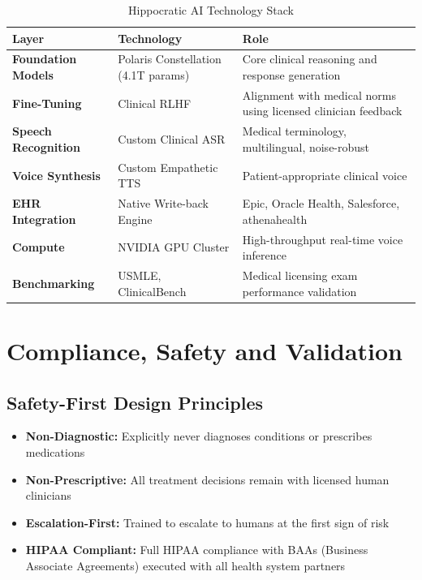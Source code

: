 \documentclass[12pt,a4paper]{article}
\begin{document}
\begin{table}[H]
\centering
\renewcommand{\arraystretch}{1.4}
\begin{tabularx}{\textwidth}{llX}
\toprule
\textbf{Layer} & \textbf{Technology} & \textbf{Role} \\
\midrule
\textbf{Foundation Models} & Polaris Constellation (4.1T params) & Core clinical reasoning and response generation \\
\textbf{Fine-Tuning} & Clinical RLHF & Alignment with medical norms using licensed clinician feedback \\
\textbf{Speech Recognition} & Custom Clinical ASR & Medical terminology, multilingual, noise-robust \\
\textbf{Voice Synthesis} & Custom Empathetic TTS & Patient-appropriate clinical voice \\
\textbf{EHR Integration} & Native Write-back Engine & Epic, Oracle Health, Salesforce, athenahealth \\
\textbf{Compute} & NVIDIA GPU Cluster & High-throughput real-time voice inference \\
\textbf{Benchmarking} & USMLE, ClinicalBench & Medical licensing exam performance validation \\
\bottomrule
\end{tabularx}
\caption{Hippocratic AI Technology Stack}
\end{table}

\newpage

\section{Compliance, Safety and Validation}

\subsection{Safety-First Design Principles}

\begin{itemize}[noitemsep]
    \item \textbf{Non-Diagnostic:} Explicitly never diagnoses conditions or prescribes medications
    \item \textbf{Non-Prescriptive:} All treatment decisions remain with licensed human clinicians
    \item \textbf{Escalation-First:} Trained to escalate to humans at the first sign of risk
    \item \textbf{HIPAA Compliant:} Full HIPAA compliance with BAAs (Business Associate Agreements) executed with all health system partners
\end{itemize}
\end{document}
